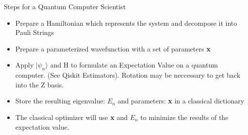 \begin{frame}{Steps for a Quantum Computer Scientist}
    \begin{itemize}
        \item Prepare a Hamiltonian which represents the system and decompose it into Pauli Strings
        \item Prepare a parameterized wavefunction with a set of parameters \textbf{x}
        \item Apply $| \psi_n \rangle$ and H to formulate an Expectation Value on a quantum computer. (See Qiskit Estimators). Rotation may be neccessary to get back into the Z basis.
        \item Store the resulting eigenvalue: $E_n$ and parameters: \textbf{x} in a classical dictionary 
        \item The classical optimizer will use \textbf{x} and $E_n$ to minimize the results of the expectation value. 
    \end{itemize}
\end{frame}








